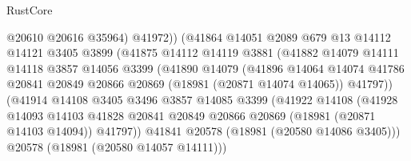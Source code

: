 \begin{lexlean}{RustCore}
\begin{coremodule}
                                  @20610
                                  @20616
                                  @35964)
                                @41972))
                            (@41864
                              @14051
                              @2089
                              @679
                              @13
                              @14112
                              @14121
                              @3405
                              @3899
                              (@41875
                                @14112
                                @14119
                                @3881
                                (@41882
                                  @14079
                                  @14111
                                  @14118
                                  @3857
                                  @14056
                                  @3399
                                  (@41890
                                    @14079
                                    (@41896
                                      @14064
                                      @14074
                                      @41786
                                      @20841
                                      @20849
                                      @20866
                                      @20869
                                      (@18981 (@20871 @14074 @14065))
                                      @41797))
                                  (@41914
                                    @14108
                                    @3405
                                    @3496
                                    @3857
                                    @14085
                                    @3399
                                    (@41922
                                      @14108
                                      (@41928
                                        @14093
                                        @14103
                                        @41828
                                        @20841
                                        @20849
                                        @20866
                                        @20869
                                        (@18981 (@20871 @14103 @14094))
                                        @41797))
                                    @41841
                                    @20578
                                    (@18981 (@20580 @14086 @3405)))
                                  @20578
                                  (@18981 (@20580 @14057 @14111)))

\end{coremodule}
\end{lexlean}
